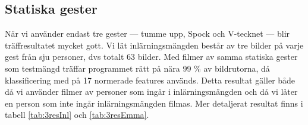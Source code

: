 \documentclass[../rapport_MVEX01-11-05]{subfiles}
\begin{document}
\subsection{Statiska gester}
När vi använder endast tre gester --- tumme upp, Spock och V-tecknet ---
blir träffresultatet mycket gott. Vi lät inlärningsmängden består av
tre bilder på varje gest från sju personer, dvs
totalt 63 bilder. Med filmer av samma statiska gester som
testmängd träffar programmet rätt på nära 99 \% av bildrutorna, då
klassificering med \knn
{}
på 17 normerade
features används. Detta
resultat gäller både då vi använder filmer av personer som ingår i
inlärningsmängden och då vi låter en person som inte ingår
inlärningsmängden filmas. Mer detaljerat resultat finns i tabell
\ref{tab:3resInl} och \ref{tab:3resEmma}.

%
\end{document}
